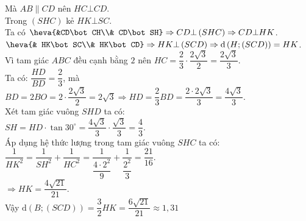 \begin{ex}
{        Mà $AB \parallel CD$ nên $HC\bot CD$.\\
        Trong $\left(SHC\right)$ kẻ $HK\bot SC$.\\
        Ta có $\heva{&CD\bot CH\\& CD\bot SH} \Rightarrow CD \bot \left(SHC\right)\Rightarrow CD\bot HK$.\\
        $\heva{& HK\bot SC\\& HK\bot CD} \Rightarrow HK\bot \left(SCD\right) \Rightarrow \mathrm{d}\left(H;\left(SCD\right) \right)=HK$.\\
        Vì tam giác $ABC$ đều cạnh bằng $2$ nên $HC=\dfrac{2}{3}\cdot\dfrac{2\sqrt{3}}{2}=\dfrac{2\sqrt{3}}{3}$.\\
        Ta có: $\dfrac{HD}{BD}=\dfrac{2}{3}$, mà $BD=2BO=2\cdot\dfrac{2\sqrt{3}}{2}=2\sqrt{3}\Rightarrow HD=\dfrac{2}{3}BD=\dfrac{2\cdot 2 \sqrt{3}}{3}=\dfrac{4\sqrt{3}}{3}$.\\
        Xét tam giác vuông $SHD$ ta có:\\ $SH=HD\cdot\tan{30^\circ}=\dfrac{4\sqrt{3}}{3}\cdot\dfrac{\sqrt{3}}{3}=\dfrac{4}{3}$.\\
        Áp dụng hệ thức lượng trong tam giác vuông $SHC$ ta có:\\
        $\dfrac{1}{HK^2}=\dfrac{1}{SH^2}+\dfrac{1}{HC^2}=\dfrac{1}{\dfrac{{{4\cdot2}^2}}{9}}+\dfrac{1}{\dfrac{2^2}{3}}=\dfrac{21}{16}$.\\
        $\Rightarrow HK=\dfrac{4\sqrt{21}}{21}$.\\
        Vậy $\mathrm{d}\left(B;\left(SCD\right) \right)=\dfrac{3}{2}HK=\dfrac{6\sqrt{21}}{21}\approx 1{,}31$}
\end{ex}

